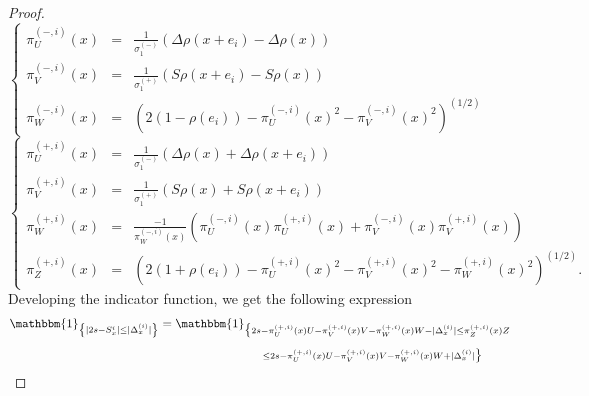 \documentclass[12pt]{article}
\theoremstyle{Theorem}
\theoremstyle{definition}
\begin{document}
\begin{proof}
 $\left\{
 \begin{array}{rlc}
   \pi^{\scriptscriptstyle(-, i)}_{U}(x) & = & \frac{1}{\sigma^{\scriptscriptstyle (-)}_{1}}\left(\Delta \rho(x+e_i) -\Delta \rho(x)\right) \\
   \pi^{\scriptscriptstyle(-, i)}_{V}(x) & = &  \frac{1}{\sigma^{\scriptscriptstyle (+)}_{1}}\left(S\rho(x+e_i)-S\rho(x)\right)  \\
   \pi^{\scriptscriptstyle(-, i)}_{W}(x)& = & \left(2(1 - \rho(e_{i})) - \pi^{\scriptscriptstyle(-, i)}_{U}(x)^{2} - \pi^{\scriptscriptstyle(-, i)}_{V}(x)^{2}\right)^{\scriptscriptstyle (1/2)} \end{array}\right.$ \\
    $\left\{
 \begin{array}{rlc}
   \pi^{\scriptscriptstyle(+, i)}_{U}(x) & = &  \frac{1}{\sigma^{\scriptscriptstyle (-)}_{1}}\left(\Delta \rho(x) + \Delta \rho(x+e_i)\right) \\
    \pi^{\scriptscriptstyle(+, i)}_{V}(x) & = & \frac{1}{\sigma^{\scriptscriptstyle (+)}_{1}}\left(S \rho(x) + S\rho(x+e_i)\right) \\
     \pi^{\scriptscriptstyle(+, i)}_{W}(x) & = & \frac{-1}{\pi^{\scriptscriptstyle(-, i)}_{W}(x)}\left(\pi^{\scriptscriptstyle(-, i)}_{U}(x)\pi^{\scriptscriptstyle(+, i)}_{U}(x) + \pi^{\scriptscriptstyle(-, i)}_{V}(x)\pi^{\scriptscriptstyle(+, i)}_{V}(x)\right) \\
   \pi^{\scriptscriptstyle(+, i)}_{Z}(x)& = & \left(2(1 + \rho(e_i)) - \pi^{\scriptscriptstyle(+, i)}_{U}(x)^{2} - \pi^{\scriptscriptstyle(+, i)}_{V}(x)^{2} - \pi^{\scriptscriptstyle(+, i)}_{W}(x)^{2}\right)^{\scriptscriptstyle (1/2)}.
\end{array}\right.$ \\
Developing the indicator function, we get the following expression
{\small
\begin{align*}
\mathbbm{1}_{\left\{ |2s - S^{i}_{\scriptscriptstyle x}| \leq |\Delta^{\scriptscriptstyle(i)}_ {\scriptscriptstyle x}| \right\}}
& = \mathbbm{1}_{\big\{ 2s -  \pi^{\scriptscriptstyle(+, i)}_{U}(x)U -  \pi^{\scriptscriptstyle(+, i)}_{V}(x) V -  \pi^{\scriptscriptstyle(+, i)}_{W}(x) W  - |\Delta^{\scriptscriptstyle(i)}_ {\scriptscriptstyle x}| \leq \pi^{\scriptscriptstyle(+, i)}_{Z}(x)Z} \\ 
& \hspace{3cm} _{\leq 2s -  \pi^{\scriptscriptstyle(+, i)}_{U}(x)U -  \pi^{\scriptscriptstyle(+, i)}_{V}(x) V -  \pi^{\scriptscriptstyle(+, i)}_{W}(x) W + |\Delta^{\scriptscriptstyle(i)}_ {\scriptscriptstyle x}| \big\}}

\end{align*}}
\end{proof}
\end{document}
